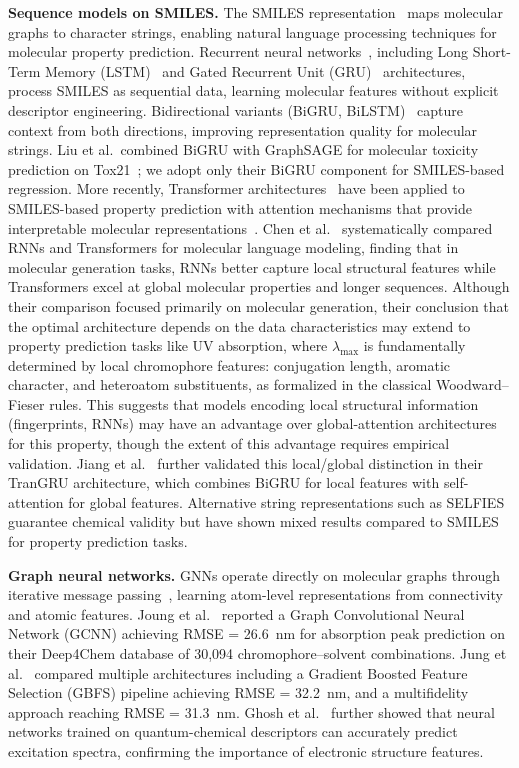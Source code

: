 \documentclass[journal=jcisd8,manuscript=article]{achemso}
\begin{document}
\textbf{Sequence models on SMILES.}
The SMILES representation~\cite{weininger1988smiles} maps molecular graphs to character strings, enabling natural language processing techniques for molecular property prediction.
Recurrent neural networks~\cite{elman1990finding}, including Long Short-Term Memory (LSTM)~\cite{hochreiter1997long} and Gated Recurrent Unit (GRU)~\cite{cho2014learning} architectures, process SMILES as sequential data, learning molecular features without explicit descriptor engineering.
Bidirectional variants (BiGRU, BiLSTM)~\cite{schuster1997bidirectional} capture context from both directions, improving representation quality for molecular strings.
Liu et al.\ combined BiGRU with GraphSAGE for molecular toxicity prediction on Tox21~\cite{liuPredictionMolecularToxicity2023}; we adopt only their BiGRU component for SMILES-based regression.
More recently, Transformer architectures~\cite{vaswani2017attention} have been applied to SMILES-based property prediction with attention mechanisms that provide interpretable molecular representations~\cite{hondaSMILESTransformerPretrained2019}.
Chen et al.~\cite{chenMolecularLanguage2023} systematically compared RNNs and Transformers for molecular language modeling, finding that in molecular generation tasks, RNNs better capture local structural features while Transformers excel at global molecular properties and longer sequences.
Although their comparison focused primarily on molecular generation, their conclusion that the optimal architecture depends on the data characteristics may extend to property prediction tasks like UV absorption, where $\lambda_{\max}$ is fundamentally determined by local chromophore features: conjugation length, aromatic character, and heteroatom substituents, as formalized in the classical Woodward--Fieser rules.
This suggests that models encoding local structural information (fingerprints, RNNs) may have an advantage over global-attention architectures for this property, though the extent of this advantage requires empirical validation.
Jiang et al.~\cite{jiang2023trangru} further validated this local/global distinction in their TranGRU architecture, which combines BiGRU for local features with self-attention for global features.
Alternative string representations such as SELFIES~\cite{krenn2020selfies} guarantee chemical validity but have shown mixed results compared to SMILES for property prediction tasks.

\textbf{Graph neural networks.}
GNNs operate directly on molecular graphs through iterative message passing~\cite{gilmer2017neural}, learning atom-level representations from connectivity and atomic features.
Joung et al.~\cite{joung2021deep} reported a Graph Convolutional Neural Network (GCNN) achieving RMSE = 26.6~nm for absorption peak prediction on their Deep4Chem database of 30,094 chromophore--solvent combinations.
Jung et al.~\cite{jung2024machine} compared multiple architectures including a Gradient Boosted Feature Selection (GBFS) pipeline achieving RMSE = 32.2~nm, and a multifidelity approach reaching RMSE = 31.3~nm.
Ghosh et al.~\cite{ghosh2019deep} further showed that neural networks trained on quantum-chemical descriptors can accurately predict excitation spectra, confirming the importance of electronic structure features.
\end{document}
